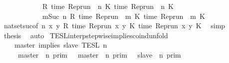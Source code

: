 \begin{isabellebody}
\ \ \ \ \ \ \ \ \ {\isacharequal}\ {\isacharbraceleft}\ {\isasymrho}{\isachardot}\ R\ {\isacharparenleft}time\ {\isacharparenleft}{\isacharparenleft}Rep{\isacharunderscore}run\ {\isasymrho}{\isacharparenright}\ n\ K\ time\ {\isacharparenleft}{\isacharparenleft}Rep{\isacharunderscore}run\ {\isasymrho}{\isacharparenright}\ n\ K\ {\isacharbraceright}\isanewline
\ \ \ \ \ \ \ \ \ {\isasyminter}\ {\isacharbraceleft}\ {\isasymrho}{\isachardot}\ {\isasymforall}m{\isasymge}Suc\ n{\isachardot}\ R\ {\isacharparenleft}time\ {\isacharparenleft}{\isacharparenleft}Rep{\isacharunderscore}run\ {\isasymrho}{\isacharparenright}\ m\ K\ time\ {\isacharparenleft}{\isacharparenleft}Rep{\isacharunderscore}run\ {\isasymrho}{\isacharparenright}\ m\ K\ {\isacharbraceright}{\isacartoucheclose}\isanewline
\ \ \ \ \ \ \isamarkupfalse%
\ nat{\isacharunderscore}set{\isacharunderscore}suc{\isacharbrackleft}of\ {\isacartoucheopen}n{\isacartoucheclose}\ {\isacartoucheopen}{\isasymlambda}x\ y{\isachardot}\ R\ {\isacharparenleft}time\ {\isacharparenleft}{\isacharparenleft}Rep{\isacharunderscore}run\ x{\isacharparenright}\ y\ K\ time\ {\isacharparenleft}{\isacharparenleft}Rep{\isacharunderscore}run\ x{\isacharparenright}\ y\ K\ \isamarkupfalse%
\ simp\isanewline
\ \ \isamarkupfalse%
\ \isamarkupfalse%
\ {\isacharquery}thesis\ \isamarkupfalse%
\ auto\isanewline
{}\isamarkupfalse%
%
\endisatagproof
{\isafoldproof}%
%
\isadelimproof
\isanewline
%
\endisadelimproof
\isanewline
{}\isamarkupfalse%
\ TESL{\isacharunderscore}interp{\isacharunderscore}stepwise{\isacharunderscore}implies{\isacharunderscore}coind{\isacharunderscore}unfold{\isacharcolon}\isanewline
\ \ \ {\isacartoucheopen}{\isasymlbrakk}\ master\ implies\ slave\ {\isasymrbrakk}\isactrlsub T\isactrlsub E\isactrlsub S\isactrlsub L\isactrlbsup {\isasymge}\ n\isactrlesup \ {\isacharequal}\isanewline
\ \ \ \ {\isacharparenleft}{\isasymlbrakk}\ master\ {\isasymnot}{\isasymUp}\ n\ {\isasymrbrakk}\isactrlsub p\isactrlsub r\isactrlsub i\isactrlsub m\ {\isasymunion}\ {\isasymlbrakk}\ master\ {\isasymUp}\ n\ {\isasymrbrakk}\isactrlsub p\isactrlsub r\isactrlsub i\isactrlsub m\ {\isasyminter}\ {\isasymlbrakk}\ slave\ {\isasymUp}\ n\ {\isasymrbrakk}\isactrlsub p\isactrlsub r\isactrlsub i\isactrlsub m{\isacharparenright}\isanewline

\end{isabellebody}
